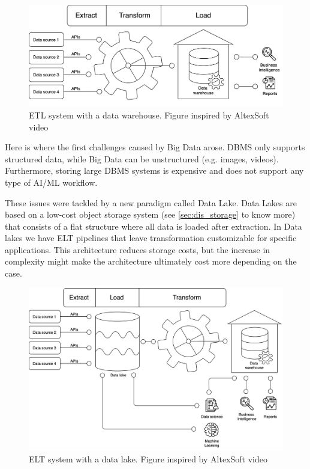 \begin{figure}[!ht]
    \begin{center}
      \includegraphics[width=\textwidth]{figures/2-background/DeltaLake_evolution-ETL+DW.png}
    \end{center}
    \caption{\gls{ETL} system with a data warehouse. Figure inspired by AltexSoft video \cite{altexsoftHowDataEngineering2021}}
    \label{fig:ETL+DW}
\end{figure}

Here is where the first challenges caused by Big Data arose. \gls{DBMS} only supports structured data, while Big Data can be unstructured (e.g. images, videos). Furthermore, storing large \gls{DBMS} systems is expensive and does not support any type of \gls{AI}/\gls{ML} workflow.

These issues were tackled by a new paradigm called Data Lake. Data Lakes are based on a low-cost object storage system (see \ref{sec:dis_storage} to know more) that consists of a flat structure where all data is loaded after extraction. In Data lakes we have \gls{ELT} pipelines that leave transformation customizable for specific applications. This architecture reduces storage costs, but the increase in complexity might make the architecture ultimately cost more depending on the case. 


\begin{figure}[!ht]
    \begin{center}
      \includegraphics[width=\textwidth]{figures/2-background/DeltaLake_evolution-ELT+DL.png}
    \end{center}
    \caption{\gls{ELT} system with a data lake. Figure inspired by AltexSoft video \cite{altexsoftHowDataEngineering2021}}
    \label{fig:ETL+DL}
\end{figure}